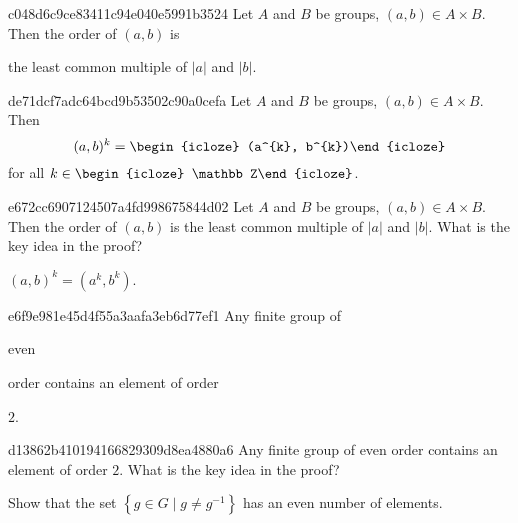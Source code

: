 \begin{note}{c048d6c9ce83411c94e040e5991b3524}
    Let \({ A }\) and \({ B }\) be groups, \({ (a, b) \in A \times B }\).
    Then the order of \({ (a, b) }\) is \begin{icloze}{1}the least common multiple of \({ \left\lvert a \right\rvert }\) and \({ \left\lvert b \right\rvert }\).\end{icloze}
\end{note}

\begin{note}{de71dcf7adc64bcd9b53502c90a0cefa}
    Let \({ A }\) and \({ B }\) be groups, \({ (a, b) \in A \times B }\).
    Then
    \[
        (a, b)^{k} = \begin{icloze}{1}(a^{k}, b^{k})\end{icloze}
    \]
    for all \({ k \in \begin{icloze}{2}\mathbb Z\end{icloze} }\).
\end{note}

\begin{note}{e672cc6907124507a4fd998675844d02}
    Let \({ A }\) and \({ B }\) be groups, \({ (a, b) \in A \times B }\).
    Then the order of \({ (a, b) }\) is the least common multiple of \({ \left\lvert a \right\rvert }\) and \({ \left\lvert b \right\rvert }\).
    What is the key idea in the proof?

    \begin{cloze}{1}
        \({ (a, b)^{k} = (a^{k}, b^{k}) }\).
    \end{cloze}
\end{note}

\begin{note}{e6f9e981e45d4f55a3aafa3eb6d77ef1}
    Any finite group of \begin{icloze}{2}even\end{icloze} order contains an element of order \begin{icloze}{1}\({ 2 }\).\end{icloze}
\end{note}

\begin{note}{d13862b410194166829309d8ea4880a6}
    Any finite group of even order contains an element of order \({ 2 }\).
    What is the key idea in the proof?

    \begin{cloze}{1}
        Show that the set \({ \left\{ g \in G \mid g \neq g^{-1} \right\} }\) has an even number of elements.
    \end{cloze}
\end{note}

